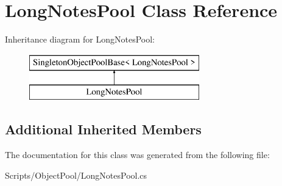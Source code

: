 \hypertarget{class_long_notes_pool}{}\section{Long\+Notes\+Pool Class Reference}
\label{class_long_notes_pool}
Inheritance diagram for Long\+Notes\+Pool\+:\begin{figure}[H]
\begin{center}
\leavevmode
\includegraphics[height=2.000000cm]{class_long_notes_pool}
\end{center}
\end{figure}
\subsection*{Additional Inherited Members}


The documentation for this class was generated from the following file\+:\begin{DoxyCompactItemize}
\item 
Scripts/\+Object\+Pool/Long\+Notes\+Pool.\+cs\end{DoxyCompactItemize}
